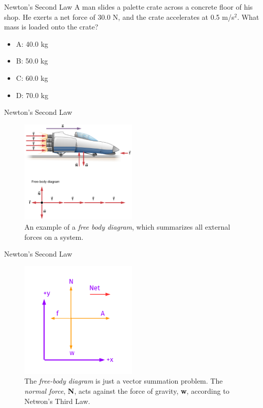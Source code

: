 \documentclass{beamer}
\begin{document}
\begin{frame}{Newton's Second Law}
A man slides a palette crate across a concrete floor of his shop.  He exerts a net force of 30.0 N, and the crate accelerates at 0.5 m/s$^2$.  What mass is loaded onto the crate?
\begin{itemize}
\item A: 40.0 kg
\item B: 50.0 kg
\item C: 60.0 kg
\item D: 70.0 kg
\end{itemize}
\end{frame}

\begin{frame}{Newton's Second Law}
\begin{figure}
\centering
\includegraphics[width=0.5\textwidth]{figures/NewtonsSecond3.png}
\caption{\label{fig:newton3} An example of a \textit{free body diagram}, which summarizes all external forces on a system.}
\end{figure}
\end{frame}

\begin{frame}{Newton's Second Law}
\begin{figure}
\centering
\includegraphics[width=0.5\textwidth,trim=0.75cm 0.5cm 0.75cm 0.5cm,clip=true]{figures/NetForce.pdf}
\caption{\label{fig:fbd} The \textit{free-body diagram} is just a vector summation problem.  The \textit{normal force}, \textbf{N}, acts against the force of gravity, \textbf{w}, according to Netwon's Third Law.}
\end{figure}
\end{frame}
\end{document}
